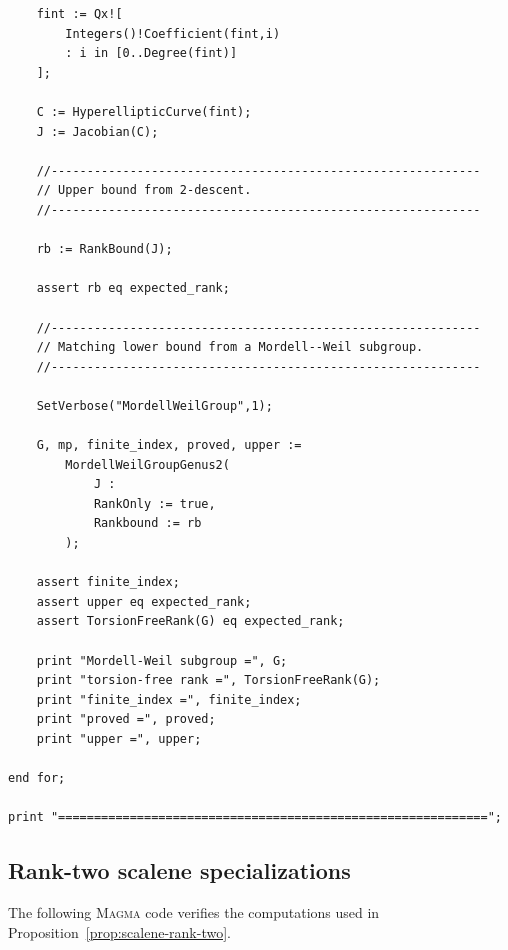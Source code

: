 \documentclass[11pt]{amsart}
\theoremstyle{plain}
\theoremstyle{remark}
\theoremstyle{plain}
\begin{document}
\begin{verbatim}
    fint := Qx![
        Integers()!Coefficient(fint,i)
        : i in [0..Degree(fint)]
    ];

    C := HyperellipticCurve(fint);
    J := Jacobian(C);

    //------------------------------------------------------------
    // Upper bound from 2-descent.
    //------------------------------------------------------------

    rb := RankBound(J);

    assert rb eq expected_rank;

    //------------------------------------------------------------
    // Matching lower bound from a Mordell--Weil subgroup.
    //------------------------------------------------------------

    SetVerbose("MordellWeilGroup",1);

    G, mp, finite_index, proved, upper :=
        MordellWeilGroupGenus2(
            J :
            RankOnly := true,
            Rankbound := rb
        );

    assert finite_index;
    assert upper eq expected_rank;
    assert TorsionFreeRank(G) eq expected_rank;

    print "Mordell-Weil subgroup =", G;
    print "torsion-free rank =", TorsionFreeRank(G);
    print "finite_index =", finite_index;
    print "proved =", proved;
    print "upper =", upper;

end for;

print "============================================================";
\end{verbatim}
\subsection{Rank-two scalene specializations}
\label{app:rank-two-scalene}

The following \textsc{Magma} code verifies the computations used in
Proposition~\ref{prop:scalene-rank-two}.
\end{document}
